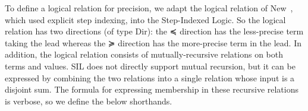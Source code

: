 To define a logical relation for precision, we adapt the logical
relation of New~\cite{New:2020ab}, which used explicit step indexing,
into the Step-Indexed Logic. So the logical relation has two
directions (of type \textsf{Dir}): the ≼ direction has the
less-precise term taking the lead whereas the ≽ direction has the
more-precise term in the lead.
%
In addition, the logical relation consists of mutually-recursive
relations on both terms and values. SIL does not directly support
mutual recursion, but it can be expressed by combining the two
relations into a single relation whose input is a disjoint sum.  The
formula for expressing membership in these recursive relations is
verbose, so we define the below shorthands.

\begin{code}%
\>[0]\AgdaSpace{}%
\AgdaSymbol{:}\AgdaSpace{}%
\<%
\\
\>[0]\AgdaSpace{}%
\AgdaSymbol{=}\AgdaSpace{}%
\AgdaSymbol{(}\AgdaSpace{}%
\AgdaSpace{}%
\AgdaSpace{}%
\AgdaSpace{}%
\AgdaSpace{}%
\AgdaSpace{}%
\AgdaSymbol{)}\AgdaSpace{}%
\AgdaSpace{}%
\AgdaSymbol{(}\AgdaSpace{}%
\AgdaSpace{}%
\AgdaSpace{}%
\AgdaSpace{}%
\AgdaSpace{}%
\AgdaSpace{}%
\AgdaSymbol{)}\<%
\\
%
\\[\AgdaEmptyExtraSkip]%
\>[0]\AgdaSpace{}%
\AgdaSymbol{:}\AgdaSpace{}%
\<%
\\
\>[0]\AgdaSpace{}%
\AgdaSymbol{=}\AgdaSpace{}%
\AgdaSpace{}%
\AgdaSpace{}%
\AgdaInductiveConstructor{[]}\<%
\\
%
\\[\AgdaEmptyExtraSkip]%
\>[0]\AgdaSpace{}%
\AgdaSymbol{:}\AgdaSpace{}%
\AgdaSpace{}%
\AgdaSpace{}%
\AgdaSpace{}%
\AgdaSpace{}%
\AgdaSpace{}%
\AgdaSpace{}%
\AgdaSymbol{\}\{}\AgdaSymbol{\}}\AgdaSpace{}%

\end{code}
